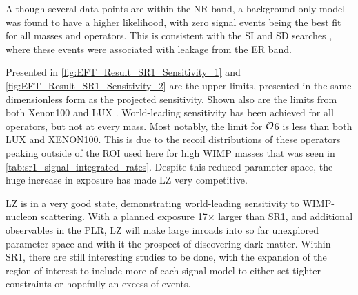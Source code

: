 


\par
Although several data points are within the NR band, a background-only model was found to have a higher likelihood, with zero signal events being the best fit for all masses and operators.
This is consistent with the SI and SD searches \cite{lz_ws_sr1_ref}, where these events were associated with leakage from the ER band.

\par
Presented in \autoref{fig:EFT_Result_SR1_Sensitivity_1} and \autoref{fig:EFT_Result_SR1_Sensitivity_2} are the upper limits, presented in the same dimensionless form as the projected sensitivity.
Shown also are the limits from both Xenon100 \cite{xenon100_eft_ref} and LUX \cite{LUX_RUN4_EFT_2021}.
World-leading sensitivity has been achieved for all operators, but not at every mass.
Most notably, the limit for $\operatorname{\mathcal{O}}$6 is less than both LUX and XENON100.
This is due to the recoil distributions of these operators peaking outside of the ROI used here for high WIMP masses that was seen in \autoref{tab:sr1_signal_integrated_rates}.
Despite this reduced parameter space, the huge increase in exposure has made LZ very competitive.


\par
LZ is in a very good state, demonstrating world-leading sensitivity to WIMP-nucleon scattering.
With a planned exposure 17$\times$ larger than SR1, and additional observables in the PLR, LZ will make large inroads into so far unexplored parameter space and with it the prospect of discovering dark matter.
Within SR1, there are still interesting studies to be done, with the expansion of the region of interest to include more of each signal model to either set tighter constraints or hopefully an excess of events.

